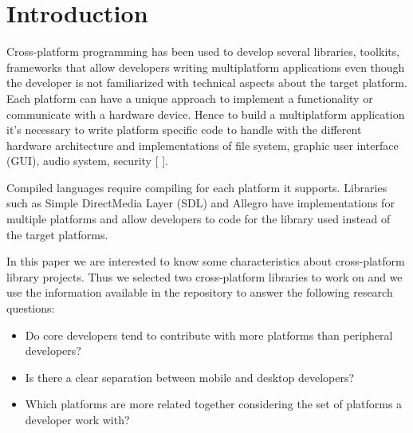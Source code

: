 \documentclass[10pt, conference]{IEEEtran}
\begin{document}
\section{Introduction}
{}
Cross-platform programming has been used to develop several libraries, toolkits, frameworks that allow developers writing multiplatform applications even though the developer is not familiarized with technical aspects about the target platform. Each platform can have a unique approach to implement a functionality or communicate with a hardware device. Hence to build a multiplatform application it’s necessary to write platform specific code to handle with the different hardware architecture and implementations of file system, graphic user interface (GUI), audio system, security [ ]. 

Compiled languages require compiling for each platform it supports. Libraries such as Simple DirectMedia Layer (SDL) and Allegro have implementations for multiple platforms and allow developers to code for the library used instead of the target platforms.     

In this paper we are interested to know some characteristics about cross-platform library projects. Thus we selected two cross-platform libraries to work on and we use the  information available in the repository to answer the following research questions:


\begin{itemize}
\item Do core developers tend to contribute with more platforms than peripheral developers?
\item Is there a clear separation between mobile and desktop developers?
\item  Which platforms are more related together considering the set of platforms a developer work with? 
\end{itemize}
\end{document}
